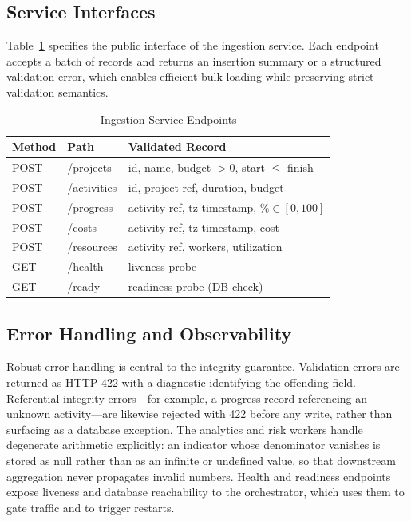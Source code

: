 \documentclass[conference]{IEEEtran}
\begin{document}
\subsection{Service Interfaces}

Table~\ref{tab:api} specifies the public interface of the ingestion service. Each endpoint accepts a batch of records and returns an insertion summary or a structured validation error, which enables efficient bulk loading while preserving strict validation semantics.

\begin{table}[t]
\caption{Ingestion Service Endpoints}
\label{tab:api}
\centering
\footnotesize
\begin{tabular}{@{}llp{3.4cm}@{}}
\toprule
\textbf{Method} & \textbf{Path} & \textbf{Validated Record} \\
\midrule
POST & /projects & id, name, budget $>0$, start $\le$ finish \\
POST & /activities & id, project ref, duration, budget \\
POST & /progress & activity ref, tz timestamp, $\% \in [0,100]$ \\
POST & /costs & activity ref, tz timestamp, cost \\
POST & /resources & activity ref, workers, utilization \\
GET & /health & liveness probe \\
GET & /ready & readiness probe (DB check) \\
\bottomrule
\end{tabular}
\end{table}

\subsection{Error Handling and Observability}

Robust error handling is central to the integrity guarantee. Validation errors are returned as HTTP 422 with a diagnostic identifying the offending field. Referential-integrity errors---for example, a progress record referencing an unknown activity---are likewise rejected with 422 before any write, rather than surfacing as a database exception. The analytics and risk workers handle degenerate arithmetic explicitly: an indicator whose denominator vanishes is stored as null rather than as an infinite or undefined value, so that downstream aggregation never propagates invalid numbers. Health and readiness endpoints expose liveness and database reachability to the orchestrator, which uses them to gate traffic and to trigger restarts.
\end{document}
